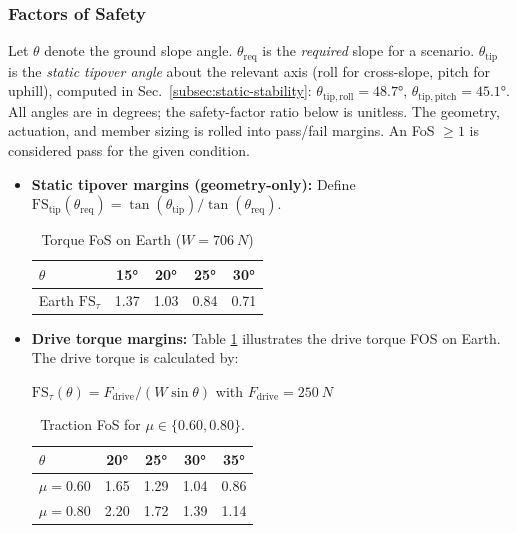 \documentclass[letterpaper, 10 pt, conference]{ieeeconf}  %
\begin{document}
\subsubsection{Factors of Safety}
Let $\theta$ denote the ground slope angle.
$\theta_{\mathrm{req}}$ is the \emph{required} slope for a scenario.
$\theta_{\mathrm{tip}}$ is the \emph{static tipover angle} about the relevant axis
(roll for cross-slope, pitch for uphill), computed in
Sec.~\ref{subsec:static-stability}:
$\theta_{\mathrm{tip,roll}}=\ang{48.7}$, $\theta_{\mathrm{tip,pitch}}=\ang{45.1}$.
All angles are in degrees; the safety-factor ratio below is unitless. The geometry, actuation, and member sizing is rolled into pass/fail margins.  
An FoS $\ge 1$ is considered pass for the given condition.
\begin{itemize}
    \item \textbf{Static tipover margins (geometry-only):} Define \(\mathrm{FS}_{\mathrm{tip}}(\theta_{\mathrm{req}})=\tan(\theta_{\mathrm{tip}})/\tan(\theta_{\mathrm{req}})\).
    

\begin{table}[htbp]
\centering
\footnotesize
\caption{Torque FoS on Earth ($W=\SI{706}{N}$)}
\label{tab:torque_fos}
\begin{tabular}{@{}lcccc@{}}
\hline
$\theta$ & \ang{15} & \ang{20} & \ang{25} & \ang{30} \\
\hline
Earth $\mathrm{FS}_{\tau}$ & 1.37 & 1.03 & 0.84 & 0.71 \\

\hline
\end{tabular}
\end{table}


\item \textbf{Drive torque margins:}
Table \ref{tab:torque_fos} illustrates the drive torque FOS on Earth. The drive torque is calculated by:

\(\mathrm{FS}_{\tau}(\theta)=F_{\mathrm{drive}}/(W\sin\theta)\) with \(F_{\mathrm{drive}}=\SI{250}{N}\)


\begin{table}[htbp]
\centering
\footnotesize
\caption{Traction FoS for $\mu \in \{0.60, 0.80\}$.}
\label{tab:traction_fos}
\begin{tabular}{@{}lcccc@{}}
\hline
$\theta$ & \ang{20} & \ang{25} & \ang{30} & \ang{35} \\
\hline
$\mu=0.60$ & 1.65 & 1.29 & 1.04 & 0.86 \\
$\mu=0.80$ & 2.20 & 1.72 & 1.39 & 1.14 \\
\hline
\end{tabular}
\end{table}




\end{itemize}
\end{document}
